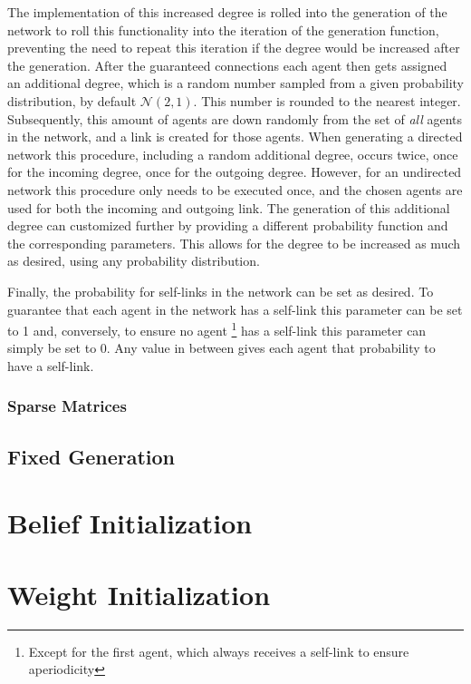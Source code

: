 \documentclass{article}
\begin{document}
\newpage

The implementation of this increased degree is rolled into the generation of the network to roll this functionality into the iteration of the generation function, preventing the need to repeat this iteration if the degree would be increased after the generation. After the guaranteed connections each agent then gets assigned an additional degree, which is a random number sampled from a given probability distribution, by default $\mathcal{N}(2,1)$. This number is rounded to the nearest integer. Subsequently, this amount of agents are down randomly from the set of \emph{all} agents in the network, and a link is created for those agents. When generating a directed network this procedure, including a random additional degree, occurs twice, once for the incoming degree, once for the outgoing degree. However, for an undirected network this procedure only needs to be executed once, and the chosen agents are used for both the incoming and outgoing link. \newline
The generation of this additional degree can customized further by providing a different probability function and the corresponding parameters. This allows for the degree to be increased as much as desired, using any probability distribution.\newline

Finally, the probability for self-links in the network can be set as desired. To guarantee that each agent in the network has a self-link this parameter can be set to 1 and, conversely, to ensure no agent \footnote{Except for the first agent, which always receives a self-link to ensure aperiodicity} has a self-link this parameter can simply be set to 0. Any value in between gives each agent that probability to have a self-link.

\subsubsection{Sparse Matrices}

\subsection{Fixed Generation}

\section{Belief Initialization}

\section{Weight Initialization}
\end{document}
